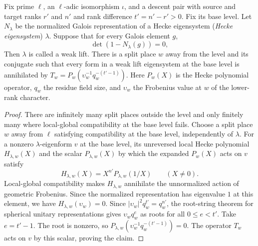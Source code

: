 \begin{lemma}
\label{lem:c-weak-lift-hecke-root}
\emitthmsource
Fix prime $\ell$, an $\ell$-adic isomorphism $\iota$, and a descent pair with source and target ranks $r'$ and $n'$ and rank difference $t'=n'-r'>0$.
Fix its base level. Let $N_\lambda$ be the normalized Galois representation of a Hecke eigensystem (\emph{Hecke eigensystem}) $\lambda$. Suppose that for every Galois element $g$,
\[
 \det(1-N_\lambda(g))=0 ,
\]
Then $\lambda$ is called a weak lift. There is a split place $w$ away from the level and its conjugate such that every form in a weak lift eigensystem at the base level is annihilated by $T_w=P_w(\upsilon_w^{-1}q_w^{-(t'-1)})$.
Here $P_w(X)$ is the Hecke polynomial operator, $q_w$ the residue field size, and $\upsilon_w$ the Frobenius value at $w$ of the lower-rank character.
\end{lemma}
\begin{proof}
There are infinitely many split places outside the level and only finitely many where local-global compatibility at the base level fails.
Choose a split place $w$ away from $\ell$ satisfying compatibility at the base level, independently of $\lambda$.
For a nonzero $\lambda$-eigenform $v$ at the base level, its unreversed local Hecke polynomial $H_{\lambda,w}(X)$ and the scalar $P_{\lambda,w}(X)$ by which the expanded $P_w(X)$ acts on $v$ satisfy
\[
 H_{\lambda,w}(X)=X^{n'}P_{\lambda,w}(1/X)
 \qquad (X\ne0).
\]
Local-global compatibility makes $H_{\lambda,w}$ annihilate the unnormalized action of geometric Frobenius.
Since the normalized representation has eigenvalue $1$ at this element, we have $H_{\lambda,w}(\upsilon_w)=0$.
Since $|\upsilon_w|^2 q_w^{t'}=q_w^{n'}$, the root-string theorem for spherical unitary representations gives $\upsilon_w q_w^e$ as roots for all $0\le e<t'$.
Take $e=t'-1$. The root is nonzero, so $P_{\lambda,w}(\upsilon_w^{-1}q_w^{-(t'-1)})=0$.
The operator $T_w$ acts on $v$ by this scalar, proving the claim.
\end{proof}

